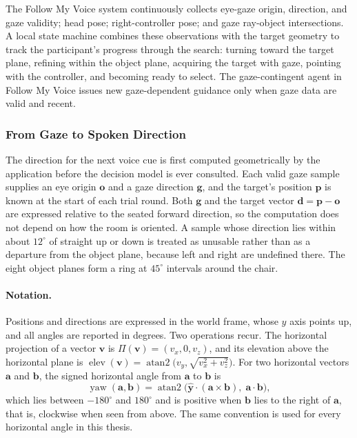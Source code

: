 The Follow My Voice system continuously collects eye-gaze origin, direction, and gaze validity; head pose; right-controller pose; and gaze ray-object intersections. A local state machine combines these observations with the target geometry to track the participant's progress through the search: turning toward the target plane, refining within the object plane, acquiring the target with gaze, pointing with the controller, and becoming ready to select. The gaze-contingent agent in Follow My Voice issues new gaze-dependent guidance only when gaze data are valid and recent.

\subsubsection{From Gaze to Spoken Direction}
\label{sec:guidance-geometry}
The direction for the next voice cue is first computed geometrically by the application before the decision model is ever consulted. Each valid gaze sample supplies an eye origin $\mathbf{o}$ and a gaze direction $\mathbf{g}$, and the target's position $\mathbf{p}$ is known at the start of each trial round. Both $\mathbf{g}$ and the target vector $\mathbf{d}=\mathbf{p}-\mathbf{o}$ are expressed relative to the seated forward direction, so the computation does not depend on how the room is oriented. A sample whose direction lies within about $12^\circ$ of straight up or down is treated as unusable rather than as a departure from the object plane, because left and right are undefined there. The eight object planes form a ring at $45^\circ$ intervals around the chair.

\paragraph{Notation.} Positions and directions are expressed in the world frame, whose $y$ axis points up, and all angles are reported in degrees. Two operations recur. The horizontal projection of a vector $\mathbf{v}$ is $\Pi(\mathbf{v})=(v_x,0,v_z)$, and its elevation above the horizontal plane is $\operatorname{elev}(\mathbf{v})=\operatorname{atan2}\bigl(v_y,\sqrt{v_x^2+v_z^2}\bigr)$. For two horizontal vectors $\mathbf{a}$ and $\mathbf{b}$, the signed horizontal angle from $\mathbf{a}$ to $\mathbf{b}$ is
\begin{equation}
\operatorname{yaw}(\mathbf{a},\mathbf{b})=\operatorname{atan2}\!\bigl(\hat{\mathbf{y}}\cdot(\mathbf{a}\times\mathbf{b}),\;\mathbf{a}\cdot\mathbf{b}\bigr),
\end{equation}
which lies between $-180^\circ$ and $180^\circ$ and is positive when $\mathbf{b}$ lies to the right of $\mathbf{a}$, that is, clockwise when seen from above. The same convention is used for every horizontal angle in this thesis.

